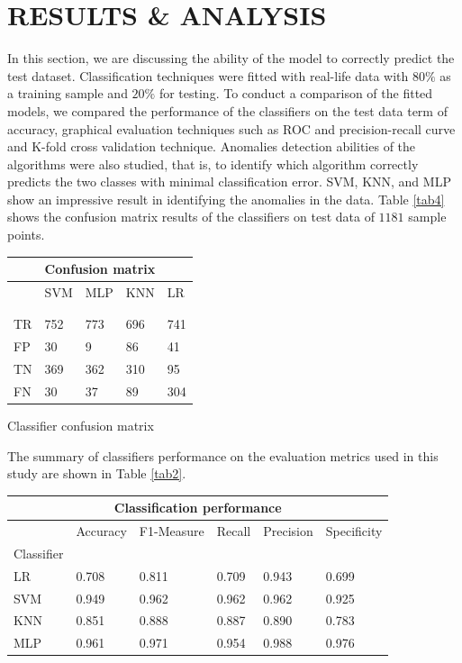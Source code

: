 \documentclass[a4paper,fleqn]{cas-dc}
\begin{document}
\section{RESULTS \& ANALYSIS} \label{sec:resu}
In this section, we are discussing the ability of the model to correctly predict the test dataset. Classification techniques were fitted with real-life data with $80\%$ as a training sample and $20\%$ for testing. To conduct a comparison of the fitted models, we compared the performance of the classifiers on the test data term of accuracy, graphical evaluation techniques such as ROC and precision-recall curve and K-fold cross validation technique. Anomalies detection abilities of the algorithms were also studied, that is, to identify which algorithm correctly predicts the two classes with minimal classification error. SVM, KNN, and MLP show an impressive result in identifying the anomalies in the data. Table \ref{tab4} shows the confusion matrix results of the classifiers on test data of $1181$ sample points.
\begin{center}
	\begin{tabular}{ |p{0.7cm}|p{0.7cm}|p{0.7cm}|p{0.7cm}|p{0.7cm}|} 
		\hline
		\hline
		\multicolumn{5}{c}{\cellcolor{gray!50}Confusion matrix} \\
		\hline
		\hline
		\cline{1-5}
		
		&SVM&MLP&KNN&LR \\
		& && & \\
		& && & \\
		\cline{1-5}
		TR &752&773&696 &741   \\
		\hline
		FP&  30   &9&86&41	\\
		\hline
		TN&369&362	&310&95	\\
		\hline
		FN &30& 37&89&304	\\
		\hline
	\end{tabular}
	\caption{Classifier confusion matrix }
	\label{tab4}
\end{center}
The  summary of classifiers performance on the evaluation metrics used in this study are shown in  Table \ref{tab2}. 
\begin{center}\label{kk}
	\begin{tabular}{ |p{1.1cm}|p{1.0cm}|p{1.1cm}|p{1.0cm}| p{1.1cm}|p{1.3cm}|} 
		
		\hline
		\multicolumn{6}{c}{\cellcolor{gray!50}Classification performance } \\
		\hline
		\hline
		\cline{1-6}
		
		&Accuracy &F1-Measure & Recall& Precision& Specificity\\
		Classifier & & & & &\\
		\cline{1-6}
		LR &0.708& 0.811&  	0.709 &0.943&0.699\\
		\hline
		SVM&   0.949  &0.962&	0.962 &0.962&0.925\\
		\hline
		KNN&0.851 &	0.888 &	0.887&0.890&0.783\\
		\hline
		MLP & 0.961& 0.971&	0.954&0.988&0.976 \\
		\hline
	\end{tabular}
	\label{tab2}
\end{center}
\end{document}
